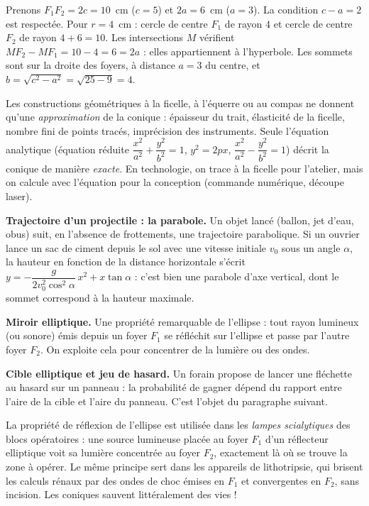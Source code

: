 \documentclass[11pt]{article}
\newcommand{\cle}[1]{{\popxbold\color{popdark}#1}}
\newcounter{popsec}
\newcounter{popsub}
\newcommand{\courssub}[1]{%
  \stepcounter{popsub}%
  \par\vspace{9pt}\noindent{\popxbold\fontsize{11.5}{13}\selectfont\color{popink}{\color{poporange}\thepopsec.\thepopsub}\hspace{6pt}#1}\par\nopagebreak\vspace{4pt}
}
\begin{document}
\begin{exemplebox}
Prenons $F_1F_2 = 2c = 10$~cm ($c=5$) et $2a = 6$~cm ($a=3$). La condition $c-a = 2$ est respectée.
Pour $r = 4$~cm : cercle de centre $F_1$ de rayon $4$ et cercle de centre $F_2$ de rayon $4+6=10$.
Les intersections $M$ vérifient $MF_2 - MF_1 = 10 - 4 = 6 = 2a$ : elles appartiennent à l'hyperbole.
Les sommets sont sur la droite des foyers, à distance $a=3$ du centre, et $b = \sqrt{c^2-a^2} = \sqrt{25-9} = 4$.
\end{exemplebox}

\begin{attention}
Les constructions géométriques à la ficelle, à l'équerre ou au compas ne donnent qu'une \emph{approximation} de la conique : épaisseur du trait, élasticité de la ficelle, nombre fini de points tracés, imprécision des instruments. Seule l'\cle{équation analytique} (équation réduite $\dfrac{x^2}{a^2}+\dfrac{y^2}{b^2}=1$, $y^2=2px$, $\dfrac{x^2}{a^2}-\dfrac{y^2}{b^2}=1$) décrit la conique de manière \emph{exacte}. En technologie, on trace à la ficelle pour l'atelier, mais on calcule avec l'équation pour la conception (commande numérique, découpe laser).
\end{attention}

\courssub{Problèmes concrets modélisés par des coniques}

\textbf{Trajectoire d'un projectile : la parabole.} Un objet lancé (ballon, jet d'eau, obus) suit, en l'absence de frottements, une trajectoire parabolique. Si un ouvrier lance un sac de ciment depuis le sol avec une vitesse initiale $v_0$ sous un angle $\alpha$, la hauteur en fonction de la distance horizontale s'écrit $y = -\dfrac{g}{2v_0^2\cos^2\alpha}\,x^2 + x\tan\alpha$ : c'est bien une parabole d'axe vertical, dont le sommet correspond à la hauteur maximale.

\textbf{Miroir elliptique.} Une propriété remarquable de l'ellipse : tout rayon lumineux (ou sonore) émis depuis un foyer $F_1$ se réfléchit sur l'ellipse et passe par l'autre foyer $F_2$. On exploite cela pour concentrer de la lumière ou des ondes.

\textbf{Cible elliptique et jeu de hasard.} Un forain propose de lancer une fléchette au hasard sur un panneau : la probabilité de gagner dépend du rapport entre l'aire de la cible et l'aire du panneau. C'est l'objet du paragraphe suivant.

\begin{savaistu}
La propriété de réflexion de l'ellipse est utilisée dans les \emph{lampes scialytiques} des blocs opératoires : une source lumineuse placée au foyer $F_1$ d'un réflecteur elliptique voit sa lumière concentrée au foyer $F_2$, exactement là où se trouve la zone à opérer. Le même principe sert dans les appareils de lithotripsie, qui brisent les calculs rénaux par des ondes de choc émises en $F_1$ et convergentes en $F_2$, sans incision. Les coniques sauvent littéralement des vies !
\end{savaistu}
\end{document}
